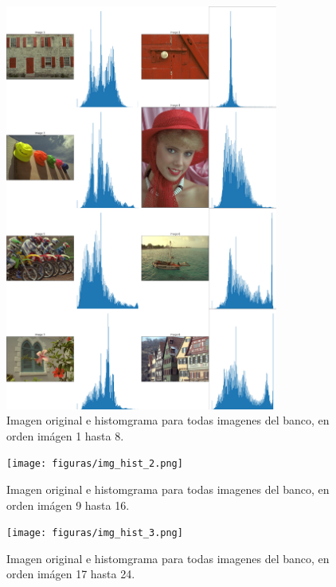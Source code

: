 \begin{figure}
    \centering
    \includegraphics[width=0.8\textwidth]{figuras/img_hist_1.png}
    \caption{Imagen original e histomgrama para todas imagenes del banco, en orden im\'agen 1 hasta 8.}
\end{figure}

\begin{figure}
    \centering
    \texttt{[image: figuras/img\_hist\_2.png]}
    \caption{Imagen original e histomgrama para todas imagenes del banco, en orden im\'agen 9 hasta 16.}
\end{figure}

\begin{figure}
    \centering
    \texttt{[image: figuras/img\_hist\_3.png]}
    \caption{Imagen original e histomgrama para todas imagenes del banco, en orden im\'agen 17 hasta 24.}
\end{figure}

